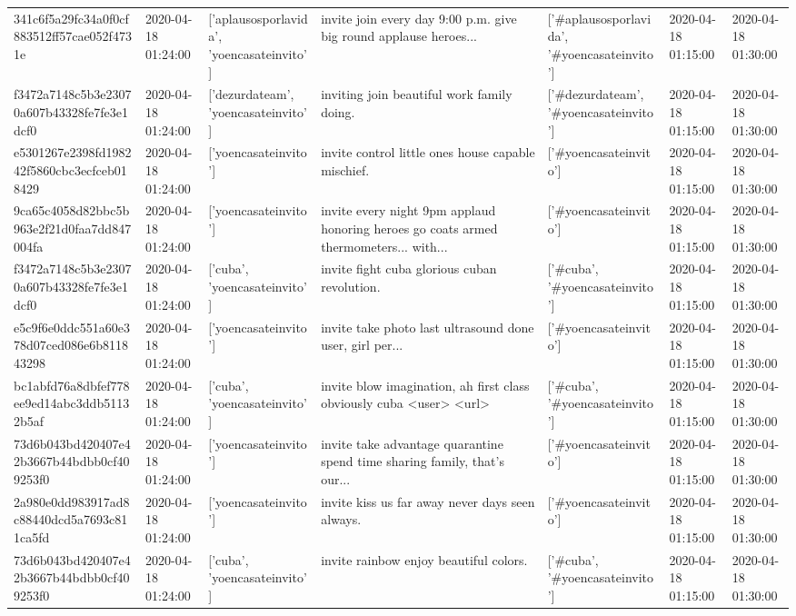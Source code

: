 \begin{tabular}{lllllll}
341c6f5a29fc34a0f0cf883512ff57cae052f4731e & 2020-04-18 01:24:00 & ['aplausosporlavida', 'yoencasateinvito'] & invite join every day 9:00 p.m. give big round applause heroes... & ['#aplausosporlavida', '#yoencasateinvito'] & 2020-04-18 01:15:00 & 2020-04-18 01:30:00 \\
f3472a7148c5b3e23070a607b43328fe7fe3e1dcf0 & 2020-04-18 01:24:00 & ['dezurdateam', 'yoencasateinvito'] & inviting join beautiful work family doing. & ['#dezurdateam', '#yoencasateinvito'] & 2020-04-18 01:15:00 & 2020-04-18 01:30:00 \\
e5301267e2398fd198242f5860cbc3ecfceb018429 & 2020-04-18 01:24:00 & ['yoencasateinvito'] & invite control little ones house capable mischief. & ['#yoencasateinvito'] & 2020-04-18 01:15:00 & 2020-04-18 01:30:00 \\
9ca65c4058d82bbc5b963e2f21d0faa7dd847004fa & 2020-04-18 01:24:00 & ['yoencasateinvito'] & invite every night 9pm applaud honoring heroes go coats armed thermometers... with... & ['#yoencasateinvito'] & 2020-04-18 01:15:00 & 2020-04-18 01:30:00 \\
f3472a7148c5b3e23070a607b43328fe7fe3e1dcf0 & 2020-04-18 01:24:00 & ['cuba', 'yoencasateinvito'] & invite fight cuba glorious cuban revolution. & ['#cuba', '#yoencasateinvito'] & 2020-04-18 01:15:00 & 2020-04-18 01:30:00 \\
e5c9f6e0ddc551a60e378d07ced086e6b811843298 & 2020-04-18 01:24:00 & ['yoencasateinvito'] & invite take photo last ultrasound done user, girl per... & ['#yoencasateinvito'] & 2020-04-18 01:15:00 & 2020-04-18 01:30:00 \\
bc1abfd76a8dbfef778ee9ed14abc3ddb51132b5af & 2020-04-18 01:24:00 & ['cuba', 'yoencasateinvito'] & invite blow imagination, ah first class obviously cuba <user> <url> & ['#cuba', '#yoencasateinvito'] & 2020-04-18 01:15:00 & 2020-04-18 01:30:00 \\
73d6b043bd420407e42b3667b44bdbb0cf409253f0 & 2020-04-18 01:24:00 & ['yoencasateinvito'] & invite take advantage quarantine spend time sharing family, that's our... & ['#yoencasateinvito'] & 2020-04-18 01:15:00 & 2020-04-18 01:30:00 \\
2a980e0dd983917ad8c88440dcd5a7693c811ca5fd & 2020-04-18 01:24:00 & ['yoencasateinvito'] & invite kiss us far away never days seen always. & ['#yoencasateinvito'] & 2020-04-18 01:15:00 & 2020-04-18 01:30:00 \\
73d6b043bd420407e42b3667b44bdbb0cf409253f0 & 2020-04-18 01:24:00 & ['cuba', 'yoencasateinvito'] & invite rainbow enjoy beautiful colors. & ['#cuba', '#yoencasateinvito'] & 2020-04-18 01:15:00 & 2020-04-18 01:30:00 \\

\end{tabular}
